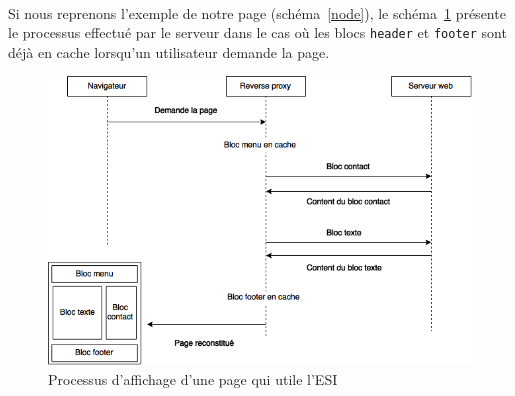    \paragraph{}
   Si nous reprenons l'exemple de notre page (schéma~\ref{node}), le schéma~\ref{esi} présente le processus effectué par le serveur dans le cas où les blocs \verb?header? et \verb?footer? sont déjà en cache lorsqu'un utilisateur demande la page.
   		\begin{figure}[H]
        \begin{center}
          \includegraphics[scale=0.75]{images/esi}
        \end{center}
        \caption{Processus d'affichage d'une page qui utile l'ESI}
        \label{esi}
      \end{figure}
   
